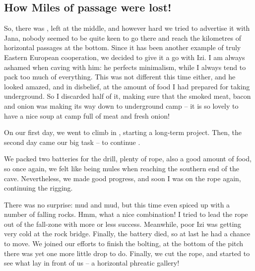 

\subsection{How Miles of passage were
lost!}

So, there was , left at the middle, and however
hard we tried to advertise it with Jana, nobody seemed to be quite keen
to go there and reach the kilometres of horizontal passages at the
bottom. Since it has been another example of truly Eastern European
cooperation, we decided to give it a go with Izi. I am always ashamed
when caving with him: he perfects minimalism, while I always tend to
pack too much of everything. This was not different this time either,
and he looked amazed, and in disbelief, at the amount of food I had
prepared for taking underground. So I discarded half of it, making sure
that the smoked meat, bacon and onion was making its way down to
underground camp -- it is so lovely to have a nice soup at camp full of
meat and fresh onion!

On our first day, we went to climb in ,
starting a long-term project. Then, the second day came our big task --
to continue .

We packed two batteries for the drill, plenty of rope, also a good
amount of food, so once again, we felt like being mules when reaching
the southern end of the cave. Nevertheless, we made good progress, and
soon I was on the rope again, continuing the rigging.

There was no surprise: mud and mud, but this time even spiced up with a
number of falling rocks. Hmm, what a nice combination! I tried to lead
the rope out of the fall-zone with more or less success. Meanwhile, poor
Izi was getting very cold at the rock bridge. Finally, the battery died,
so at last he had a chance to move. We joined our efforts to finish the
bolting, at the bottom of the pitch there was yet one more little drop
to do. Finally, we cut the rope, and started to see what lay in front of
us -- a horizontal phreatic gallery!

